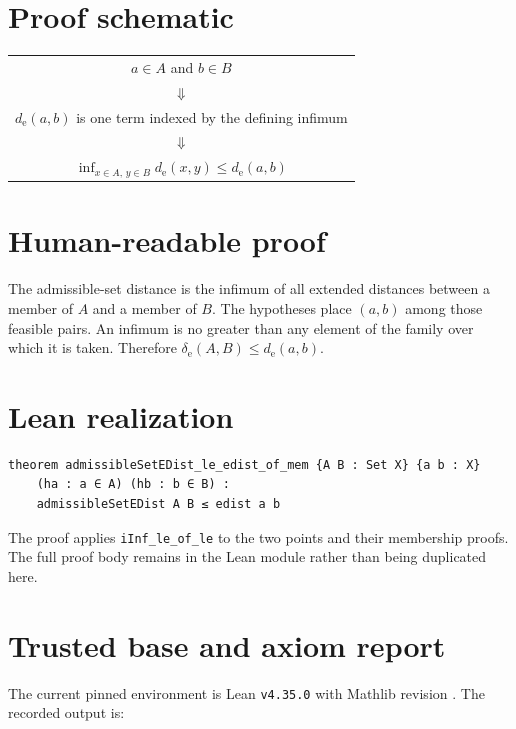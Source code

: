 \documentclass[11pt]{article}
\begin{document}
\section{Proof schematic}

\begin{center}
\begin{tabular}{c}
$a\in A$ and $b\in B$ \\
$\Downarrow$ \\
$d_{\mathrm e}(a,b)$ is one term indexed by the defining infimum \\
$\Downarrow$ \\
$\inf_{x\in A,\,y\in B}d_{\mathrm e}(x,y)\le d_{\mathrm e}(a,b)$
\end{tabular}
\end{center}

\section{Human-readable proof}

The admissible-set distance is the infimum of all extended distances between a member of
$A$ and a member of $B$. The hypotheses place $(a,b)$ among those feasible pairs. An
infimum is no greater than any element of the family over which it is taken. Therefore
$\delta_{\mathrm e}(A,B)\le d_{\mathrm e}(a,b)$.

\section{Lean realization}

\begin{lstlisting}
theorem admissibleSetEDist_le_edist_of_mem {A B : Set X} {a b : X}
    (ha : a ∈ A) (hb : b ∈ B) :
    admissibleSetEDist A B ≤ edist a b
\end{lstlisting}

The proof applies \texttt{iInf\_le\_of\_le} to the two points and their membership proofs.
The full proof body remains in the Lean module rather than being duplicated here.

\section{Trusted base and axiom report}

The current pinned environment is Lean \texttt{v4.35.0} with Mathlib revision
\texttt{}. The recorded output is:
\end{document}
